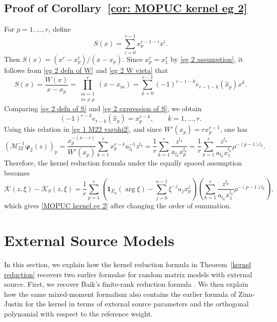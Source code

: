 \documentclass[a4paper,10pt,leqno]{amsart}
\numberwithin{equation}{section}
\theoremstyle{remark}
\begin{document}

\subsection{Proof of Corollary~\ref{cor: MOPUC kernel eg 2}}

For \(p=1,\ldots,r\), define
\begin{equation} \label{eg 2 defn of S}
S(x)=\sum_{i=0}^{r-1}x_p^{r-1-i}x^i.
\end{equation}
Then \(S(x)=(x^r-x_p^r)/(x-x_p)\). Since \(x_p^r=x_1^r\) by \eqref{eg 2 assumption}, it follows from \eqref{eg 2 defn of W} and \eqref{eg 2 W vieta} that
\begin{equation} \label{eg 2 expression of S}
S(x)=\frac{W(x)}{x-x_p}=\prod_{\substack{m=1\\ m\neq p}}^r (x-x_m)=\sum_{k=0}^{r-1}(-1)^{r-1-k}e_{r-1-k}(\hat{x}_p)x^k.
\end{equation}
Comparing \eqref{eg 2 defn of S} and \eqref{eg 2 expression of S}, we obtain
\[
(-1)^{r-k}e_{r-k}(\hat{x}_p)=x_p^{r-k}, \qquad k=1,\ldots,r.
\]
Using this relation in \eqref{eg 1 M22 varphi2}, and since \(W'(x_p)=r x_p^{r-1}\), one has
\[
\left( \bm{\mathcal{M}}_{22}^{-1} \bm{\varphi}_2(z) \right)_p = \frac{x_p^{-(n-r)}}{W'(x_p)}\sum_{k=1}^r x_p^{r-k}a_{l_k}^{-1}z^{l_k}=\frac{1}{r}\sum_{k=1}^r\frac{z^{l_k}}{a_{l_k}x_p^{l_k}}=\frac{1}{r}\sum_{k=1}^r\frac{z^{l_k}}{a_{l_k}x_1^{l_k}}\rho^{-(p-1)l_k}.
\]
Therefore, the kernel reduction formula under the equally spaced assumption becomes
\[
\mathcal K(z,\xi)-\mathcal K_0(z,\xi)=\frac{1}{r}\sum_{p=1}^r\left(\mathbf{1}_{E_p}(\arg \xi)-\sum_{j=0}^{n-1}\xi^{-j}a_jx_p^j\right)\left(\sum_{k=1}^r\frac{z^{l_k}}{a_{l_k}x_1^{l_k}}\rho^{-(p-1)l_k}\right),
\]
which gives \eqref{MOPUC kernel eg 2} after changing the order of summation.

\section{External Source Models}\label{section baik}

In this section, we explain how the kernel reduction formula in Theorem~\ref{kernel reduction}
recovers two earlier formulae for random matrix models with external source.
First, we recover Baik's finite-rank reduction formula \cite[Theorem 1]{Bai09}.  We then explain how
the same mixed-moment formalism also contains the earlier formula
of Zinn-Justin \cite[Equation (3.10)]{ZinnJustin1997} for the kernel in terms of external source parameters and the orthogonal polynomial with respect to the reference weight.
\end{document}
